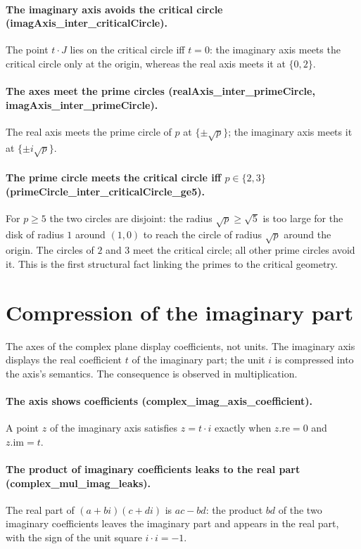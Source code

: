 \documentclass[sigplan,10pt,anonymous,review]{acmart}
\begin{document}
\paragraph{The imaginary axis avoids the critical circle
(imagAxis\_inter\_criticalCircle).} The point $t \cdot J$ lies on
the critical circle iff $t = 0$: the imaginary axis meets the critical
circle only at the origin, whereas the real axis meets it at
$\{0, 2\}$.

\paragraph{The axes meet the prime circles
(realAxis\_inter\_primeCircle, imagAxis\_inter\_primeCircle).}
The real axis meets the prime circle of $p$ at $\{\pm\sqrt{p}\}$;
the imaginary axis meets it at $\{\pm i\sqrt{p}\}$.

\paragraph{The prime circle meets the critical circle iff
$p \in \{2, 3\}$ (primeCircle\_inter\_criticalCircle\_ge5).}
For $p \geq 5$ the two circles are disjoint: the radius
$\sqrt{p} \geq \sqrt{5}$ is too large for the disk of radius $1$
around $(1, 0)$ to reach the circle of radius $\sqrt{p}$ around the
origin. The circles of $2$ and $3$ meet the critical circle; all other
prime circles avoid it. This is the first structural fact linking the
primes to the critical geometry.

\section{Compression of the imaginary part}

The axes of the complex plane display coefficients, not units. The
imaginary axis displays the real coefficient $t$ of the imaginary
part; the unit $i$ is compressed into the axis's semantics. The
consequence is observed in multiplication.

\paragraph{The axis shows coefficients
(complex\_imag\_axis\_coefficient).} A point $z$ of the imaginary
axis satisfies $z = t \cdot i$ exactly when $z.\mathrm{re} = 0$ and
$z.\mathrm{im} = t$.

\paragraph{The product of imaginary coefficients leaks to the real
part (complex\_mul\_imag\_leaks).} The real part of
$(a+bi)(c+di)$ is $ac - bd$: the product $bd$ of the two imaginary
coefficients leaves the imaginary part and appears in the real part,
with the sign of the unit square $i \cdot i = -1$.
\end{document}
